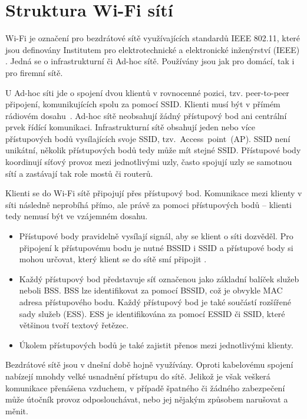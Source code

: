 \section{Struktura Wi-Fi sítí}

Wi-Fi je označení pro bezdrátové sítě využívajících standardů IEEE 802.11, které jsou definovány Institutem pro elektrotechnické a elektronické inženýrství (IEEE) \cite{beaver2015hacking}. Jedná se o infrastrukturní či Ad-hoc sítě. Používány jsou jak pro domácí, tak i pro firemní sítě.

U Ad-hoc síti jde o spojení dvou klientů v rovnocenné pozici, tzv. peer-to-peer připojení, komunikujících spolu za pomocí SSID. Klienti musí být v přímém rádiovém dosahu~\cite{ad-hocSecuring}. Ad-hoc sítě neobsahují žádný přístupový bod ani centrální prvek řídící komunikaci. Infrastrukturní sítě obsahují jeden nebo více přístupových bodů vysílajících svoje SSID, tzv.~Access~point~(AP). SSID není unikátní, několik přístupových bodů tedy může mít stejné SSID. Přístupové body koordinují síťový provoz mezi jednotlivými uzly, často spojují uzly se samotnou sítí a zastávají tak role mostů či routerů.

Klienti se do Wi-Fi sítě připojují přes přístupový bod. Komunikace mezi klienty v síti následně neprobíhá přímo, ale právě za pomoci přístupových bodů -- klienti tedy nemusí být ve vzájemném dosahu. 
\begin{itemize}
  \item{Přístupové body pravidelně vysílají signál, aby se klient o síti dozvěděl. Pro připojení k přístupovému bodu je nutné BSSID i SSID a přístupové body si mohou určovat, který klient se do sítě smí připojit \cite{burns2007security}.}
  \item{Každý přístupový bod představuje síť označenou jako základní balíček služeb neboli BSS. BSS lze identifikovat za pomocí BSSID, což je obvykle MAC adresa přístupového bodu. Každý přístupový bod je také součástí rozšířené sady služeb (ESS). ESS je identifikována za pomocí ESSID či SSID, které většinou tvoří textový řetězec.}
  \item{Úkolem přístupových bodů je také zajistit přenos mezi jednotlivými klienty.}
\end{itemize}

Bezdrátové sítě jsou v dnešní době hojně využívány. Oproti kabelovému spojení nabízejí mnohdy velké usnadnění přístupu do sítě. Jelikož je však veškerá komunikace přenášena vzduchem, v případě špatného či žádného zabezpečení může útočník provoz odposlouchávat, nebo jej nějakým způsobem narušovat a měnit.

